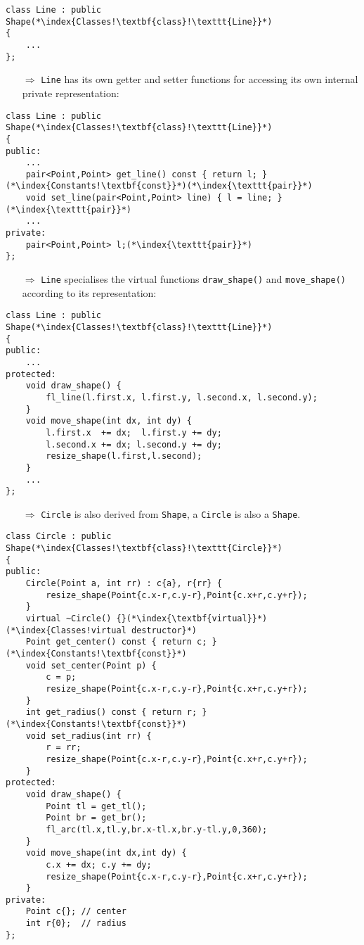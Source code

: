\documentclass[10pt]{article}
\begin{document}
\begin{lstlisting}
class Line : public Shape(*\index{Classes!\textbf{class}!\texttt{Line}}*)
{
    ...
};
\end{lstlisting}
\begin{enumerate}
\item[$\Rightarrow$] \texttt{Line} has its own getter and setter functions for accessing its own internal private representation:
\end{enumerate}
\begin{lstlisting}
class Line : public Shape(*\index{Classes!\textbf{class}!\texttt{Line}}*)
{
public:
    ...
    pair<Point,Point> get_line() const { return l; }(*\index{Constants!\textbf{const}}*)(*\index{\texttt{pair}}*)
    void set_line(pair<Point,Point> line) { l = line; }(*\index{\texttt{pair}}*)
    ...
private:
    pair<Point,Point> l;(*\index{\texttt{pair}}*)
};
\end{lstlisting}
\begin{enumerate}
\item[$\Rightarrow$] \texttt{Line} specialises the virtual functions \texttt{draw\_shape()} and \texttt{move\_shape()} according to its representation:
\end{enumerate}
\begin{lstlisting}
class Line : public Shape(*\index{Classes!\textbf{class}!\texttt{Line}}*)
{
public:
    ...
protected:
    void draw_shape() {
        fl_line(l.first.x, l.first.y, l.second.x, l.second.y);
    }
    void move_shape(int dx, int dy) {
        l.first.x  += dx;  l.first.y += dy;
        l.second.x += dx; l.second.y += dy;
        resize_shape(l.first,l.second);
    }
    ...
};
\end{lstlisting}
\begin{enumerate}
\item[$\Rightarrow$] \texttt{Circle} is also derived from \texttt{Shape}, a \texttt{Circle} is also a \texttt{Shape}.
\end{enumerate}
\begin{lstlisting}
class Circle : public Shape(*\index{Classes!\textbf{class}!\texttt{Circle}}*)
{
public:
    Circle(Point a, int rr) : c{a}, r{rr} {
        resize_shape(Point{c.x-r,c.y-r},Point{c.x+r,c.y+r});
    }
    virtual ~Circle() {}(*\index{\textbf{virtual}}*)(*\index{Classes!virtual destructor}*)
    Point get_center() const { return c; }(*\index{Constants!\textbf{const}}*)
    void set_center(Point p) {
        c = p;
        resize_shape(Point{c.x-r,c.y-r},Point{c.x+r,c.y+r});
    }
    int get_radius() const { return r; }(*\index{Constants!\textbf{const}}*)
    void set_radius(int rr) {
        r = rr;
        resize_shape(Point{c.x-r,c.y-r},Point{c.x+r,c.y+r});
    }
protected:
    void draw_shape() {
        Point tl = get_tl();
        Point br = get_br();
        fl_arc(tl.x,tl.y,br.x-tl.x,br.y-tl.y,0,360);
    }
    void move_shape(int dx,int dy) {
        c.x += dx; c.y += dy;
        resize_shape(Point{c.x-r,c.y-r},Point{c.x+r,c.y+r});
    }
private:
    Point c{}; // center
    int r{0};  // radius
};
\end{lstlisting}
%
%
\end{document}
